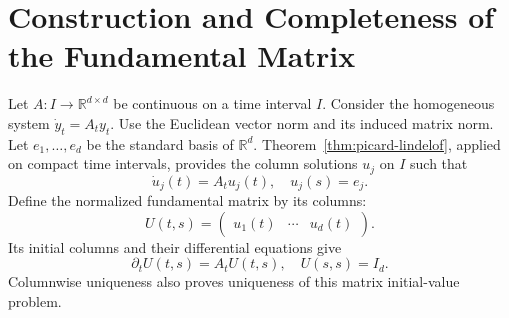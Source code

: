 \documentclass[12pt,a4paper,oneside]{book}
\begin{document}
\section{Construction and Completeness of the Fundamental Matrix}

\label{app:linear-fundamental}
Let $A:I\to\mathbb R^{d\times d}$ be continuous on a time interval $I$.
Consider the homogeneous system $\dot y_t=A_ty_t$. Use the Euclidean
vector norm and its induced matrix norm. Let
$e_1,\ldots,e_d$ be the standard basis of $\mathbb R^d$.
Theorem~\ref{thm:picard-lindelof}, applied on compact time intervals,
provides the column solutions $u_j$ on $I$ such that
\begin{equation*}
\dot u_j(t)=A_tu_j(t),\quad u_j(s)=e_j.
\end{equation*}
Define the normalized fundamental matrix by its columns:
\begin{equation*}
U(t,s)=\begin{pmatrix}u_1(t)&\cdots&u_d(t)\end{pmatrix}.
\end{equation*}
Its initial columns and their differential equations give
\begin{equation}
    \partial_tU(t,s)=A_tU(t,s),\quad U(s,s)=I_d.
    \label{eq:fundamental-U-appendix}
\end{equation}
Columnwise uniqueness also proves uniqueness of this matrix initial-value problem.
\end{document}

